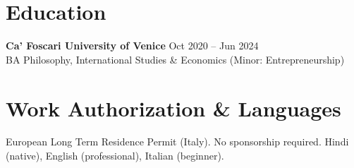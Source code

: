 \documentclass[a4paper,10pt]{article}
\begin{document}
\section{Education}
\textbf{Ca' Foscari University of Venice} \hfill Oct 2020 -- Jun 2024\\
BA Philosophy, International Studies \& Economics (Minor: Entrepreneurship)

\section{Work Authorization \& Languages}
European Long Term Residence Permit (Italy). No sponsorship required. Hindi (native), English (professional), Italian (beginner).
\end{document}
